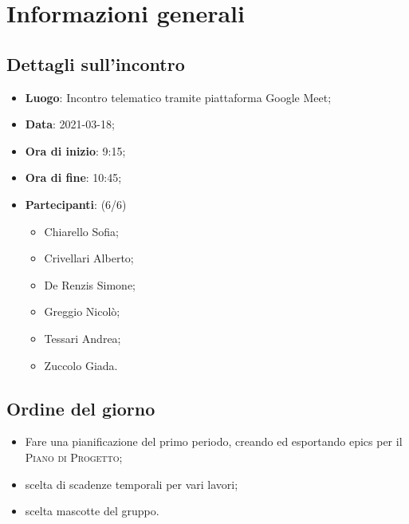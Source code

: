\section{Informazioni generali}

\subsection{Dettagli sull'incontro}
\begin{itemize}
\item \textbf{Luogo}: Incontro telematico tramite piattaforma Google Meet;
\item \textbf{Data}: 2021-03-18;
\item \textbf{Ora di inizio}: 9:15;
\item \textbf{Ora di fine}: 10:45;
\item \textbf{Partecipanti}: (6/6) 
\begin{itemize}
	\item Chiarello Sofia;
	\item Crivellari Alberto;
	\item De Renzis Simone;
	\item Greggio Nicolò;
	\item Tessari Andrea;
	\item Zuccolo Giada.
\end{itemize}
\end{itemize}

\subsection{Ordine del giorno}
\begin{itemize}
	\item Fare una pianificazione del primo periodo, creando ed esportando epics per il \textsc{Piano di Progetto};
	\item scelta di scadenze temporali per vari lavori;
	\item scelta mascotte del gruppo.
	
\end{itemize}



